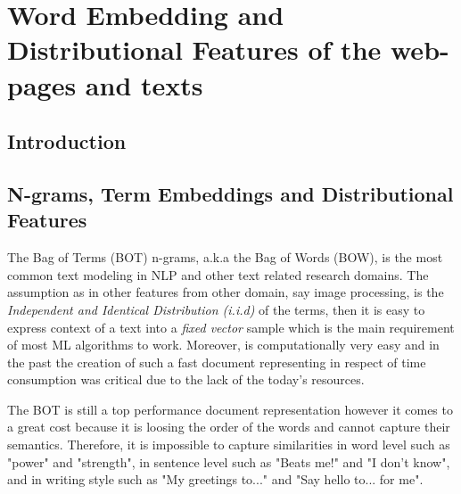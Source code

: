 
\chapter{Word Embedding and Distributional Features of the web-pages and texts}

\label{chap:word_embedding}



\newcommand{\keyword}[1]{\textbf{#1}}
\newcommand{\tabhead}[1]{\textbf{#1}}
\newcommand{\code}[1]{\texttt{#1}}
\newcommand{\file}[1]{\texttt{\bfseries#1}}
\newcommand{\option}[1]{\texttt{\itshape#1}}


\section{Introduction}\label{chap:word_embedding:sec:intro}
 
 

\section{N-grams, Term Embeddings and Distributional Features} \label{chap:word_embedding:sec:ngrans_vs_doc2vec}


The Bag of Terms (BOT) n-grams, a.k.a the Bag of Words (BOW), is the most common text modeling in NLP and other text related research domains. The assumption as in other features from other domain, say image processing, is the \textit{Independent and Identical Distribution (i.i.d)} of the terms, then it is easy to express context of a text into a \textit{fixed vector} sample which is the main requirement of most ML algorithms to work. Moreover, is computationally very easy and in the past the creation of such a fast document representing in respect of time consumption was critical due to the lack of the today's resources.

The BOT is still a top performance document representation however it comes to a great cost because it is loosing the order of the words and cannot capture their semantics. Therefore, it is impossible to capture similarities in word level such as "power" and "strength", in sentence level such as "Beats me!" and "I don't know", and in writing style such as "My greetings to..." and "Say hello to... for me". 

